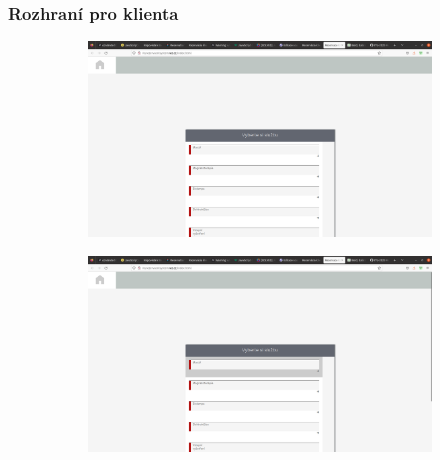 \subsubsection{Rozhraní pro klienta}

\begin{figure}[h]
    \begin{subfigure}{.5\textwidth}
        \centering
        \includegraphics[width=.8\linewidth]{doc/latex/fig/implementation/client/step1.png}
        \caption{}
        \label{fig:step1}
    \end{subfigure}
    \begin{subfigure}{.5\textwidth}
        \centering
        \includegraphics[width=.8\linewidth]{doc/latex/fig/implementation/client/step2.png}
        \label{fig:steps1}
    \end{subfigure}
\end{figure}

